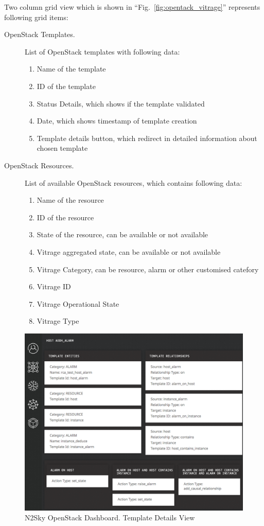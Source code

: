 Two column grid view which is shown in ``Fig.~\ref{fig:opentack_vitrage}'' represents following grid items:

\begin{description}
\item[OpenStack Templates.]  List of OpenStack templates with following data:
\begin{enumerate}
\item Name of the template
\item ID of the template
\item Status Details, which shows if the template validated 
\item Date, which shows timestamp of template creation 
\item Template details button, which redirect in detailed information about chosen template
\end{enumerate}

\item[OpenStack Resources.] List of available OpenStack resources, which contains following data:
\begin{enumerate}
\item Name of the resource
\item ID of the resource
\item State of the resource, can be available or not available
\item Vitrage aggregated state, can be available or not available
\item Vitrage Category, can be resource, alarm or other customised catefory
\item Vitrage ID
\item Vitrage Operational State
\item Vitrage Type
\end{enumerate}
\end{description}

\begin{figure}[htbp]
\begin{center}
  \includegraphics[width=\linewidth]{components/4/pics/openstack_template.png}
  \caption{N2Sky OpenStack Dashboard. Template Details View}
  \label{fig:openstack_template}
\end{center}
\end{figure}

